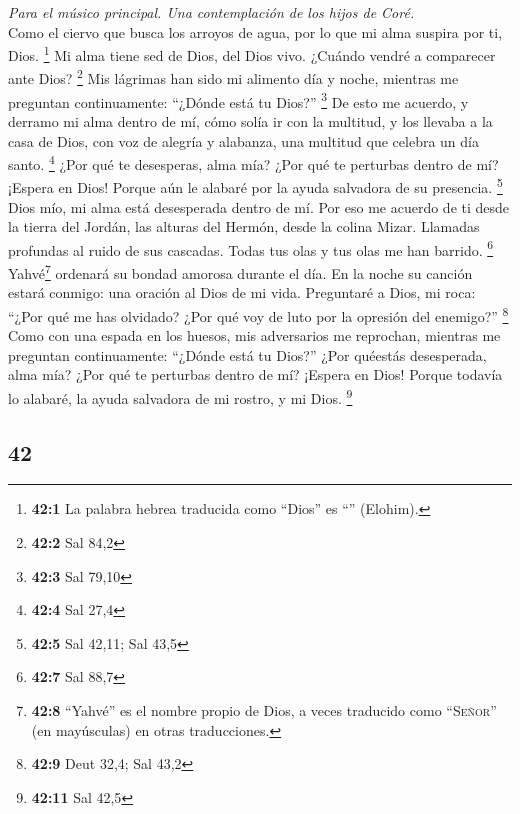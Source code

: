 \begin{paracol}{2}
\emph{Para el músico principal. Una contemplación de los hijos de
Coré.}\\
 Como el ciervo que busca los arroyos de agua, por lo que
mi alma suspira por ti, Dios. \footnote{\textbf{42:1} La palabra hebrea
  traducida como ``Dios'' es ``'' (Elohim).}
 Mi alma tiene sed de Dios, del Dios vivo. ¿Cuándo vendré
a comparecer ante Dios? \footnote{\textbf{42:2} Sal 84,2} 
Mis lágrimas han sido mi alimento día y noche, mientras me preguntan
continuamente: ``¿Dónde está tu Dios?'' \footnote{\textbf{42:3} Sal
  79,10}  De esto me acuerdo, y derramo mi alma dentro de
mí, cómo solía ir con la multitud, y los llevaba a la casa de Dios, con
voz de alegría y alabanza, una multitud que celebra un día santo.
\footnote{\textbf{42:4} Sal 27,4}  ¿Por qué te desesperas,
alma mía? ¿Por qué te perturbas dentro de mí? ¡Espera en Dios! Porque
aún le alabaré por la ayuda salvadora de su presencia. \footnote{\textbf{42:5}
  Sal 42,11; Sal 43,5}  Dios mío, mi alma está desesperada
dentro de mí. Por eso me acuerdo de ti desde la tierra del Jordán, las
alturas del Hermón, desde la colina Mizar.  Llamadas
profundas al ruido de sus cascadas. Todas tus olas y tus olas me han
barrido. \footnote{\textbf{42:7} Sal 88,7} 
Yahvé\footnote{\textbf{42:8} ``Yahvé'' es el nombre propio de Dios, a
  veces traducido como ``\textsc{Señor}'' (en mayúsculas) en otras
  traducciones.} ordenará su bondad amorosa durante el día. En la noche
su canción estará conmigo: una oración al Dios de mi vida.
 Preguntaré a Dios, mi roca: ``¿Por qué me has olvidado?
¿Por qué voy de luto por la opresión del enemigo?'' \footnote{\textbf{42:9}
  Deut 32,4; Sal 43,2}  Como con una espada en los
huesos, mis adversarios me reprochan, mientras me preguntan
continuamente: ``¿Dónde está tu Dios?''  ¿Por quéestás
desesperada, alma mía? ¿Por qué te perturbas dentro de mí? ¡Espera en
Dios! Porque todavía lo alabaré, la ayuda salvadora de mi rostro, y mi
Dios. \footnote{\textbf{42:11} Sal 42,5}

\switchcolumn
\begin{otherlanguage}{english}

\hypertarget{section-83}{%
\section{42}\label{section-83}}


\end{otherlanguage}
\end{paracol}
